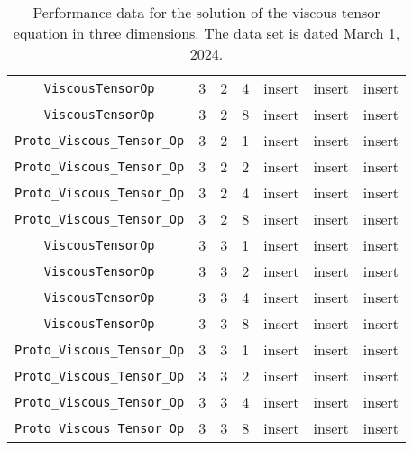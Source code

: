\documentclass{article}
\begin{document}
\begin{small}
\begin{table}
\begin{center}
\begin{tabular}{|c|c|c|c|c|c||c|}
 {\tt ViscousTensorOp}            & 3 & 2   & 4    &  insert  &  insert        & insert \\
 {\tt ViscousTensorOp}            & 3 & 2   & 8    &  insert  &  insert        & insert \\
\hline 
 {\tt Proto\_Viscous\_Tensor\_Op} & 3 & 2   & 1    &  insert  &  insert        & insert\\
 {\tt Proto\_Viscous\_Tensor\_Op} & 3 & 2   & 2    &  insert  &  insert        & insert\\
 {\tt Proto\_Viscous\_Tensor\_Op} & 3 & 2   & 4    &  insert  &  insert        & insert\\
 {\tt Proto\_Viscous\_Tensor\_Op} & 3 & 2   & 8    &  insert  &  insert        & insert\\
 \hline
\hline
 {\tt ViscousTensorOp}            & 3 & 3   & 1    &  insert  &  insert        & insert \\
 {\tt ViscousTensorOp}            & 3 & 3   & 2    &  insert  &  insert        & insert \\
 {\tt ViscousTensorOp}            & 3 & 3   & 4    &  insert  &  insert        & insert \\
 {\tt ViscousTensorOp}            & 3 & 3   & 8    &  insert  &  insert        & insert \\
\hline
 {\tt Proto\_Viscous\_Tensor\_Op} & 3 & 3   & 1    &  insert  &  insert        & insert\\
 {\tt Proto\_Viscous\_Tensor\_Op} & 3 & 3   & 2    &  insert  &  insert        & insert\\
 {\tt Proto\_Viscous\_Tensor\_Op} & 3 & 3   & 4    &  insert  &  insert        & insert\\
 {\tt Proto\_Viscous\_Tensor\_Op} & 3 & 3   & 8    &  insert  &  insert        & insert\\
\hline
\end{tabular}
\end{center}
\label{tab::viscous_3d}
\caption
    {
      Performance data for the solution of the viscous tensor equation
      in three dimensions.
      The data set is dated March 1, 2024.
    }
\end{table}
\end{small}
\end{document}
